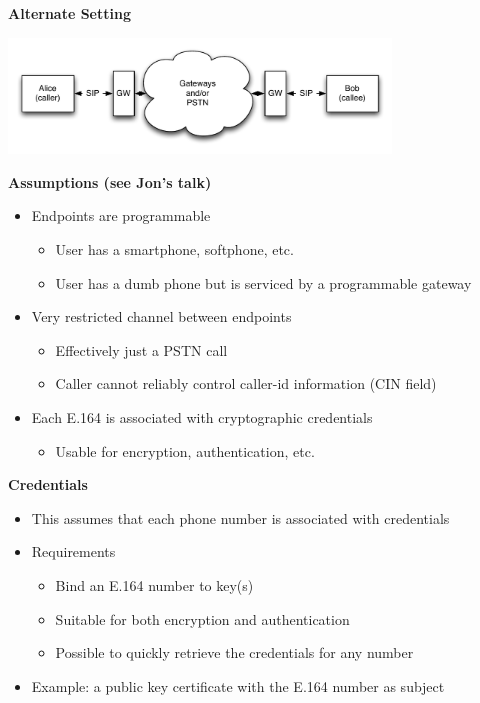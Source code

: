 \documentclass[helvetica]{seminar}
\newcommand{\heading}[1]{%
  \begin{center} 
    \large\bf 
    #1 
  \end{center} 
  \vspace{.4 in}}
\begin{document}
\begin{slide}
\heading{Alternate Setting}

\begin{center}
\includegraphics[width=4in]{setting2}
\end{center}
\end{slide}


\begin{slide}
\heading{Assumptions (see Jon's talk)}

\begin{itemize}
\item Endpoints are programmable
  \begin{itemize}
  \item User has a smartphone, softphone, etc.
  \item User has a dumb phone but is serviced by a programmable gateway
  \end{itemize}

\item Very restricted channel between endpoints
  \begin{itemize}
  \item Effectively just a PSTN call
  \item Caller cannot reliably control caller-id information (CIN field)
  \end{itemize}

\item Each E.164 is associated with cryptographic credentials
  \begin{itemize}
  \item Usable for encryption, authentication, etc.
  \end{itemize}
\end{itemize}
\end{slide}



\begin{slide}
\heading{Credentials}

\begin{itemize}
\item This assumes that each phone number is associated with credentials
\item Requirements
  \begin{itemize}
  \item Bind an E.164 number to key(s)
  \item Suitable for both encryption and authentication
  \item Possible to quickly retrieve the credentials for any number
  \end{itemize}

\item Example: a public key certificate with the E.164 number as subject
\end{itemize}
\end{slide}
\end{document}
